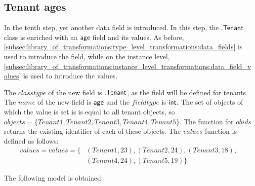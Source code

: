 \subsection{Tenant ages}
\label{sec:application:building_the_model:tenant_ages}

In the tenth step, yet another data field is introduced. In this step, the $.\mathsf{Tenant}$ class is enriched with an $\mathsf{age}$ field and its values. As before, \cref{subsec:library_of_transformations:type_level_transformations:data_fields} is used to introduce the field, while on the instance level, \cref{subsec:library_of_transformations:instance_level_transformations:data_field_values} is used to introduce the values.

The $classtype$ of the new field is $.\mathsf{Tenant}$, as the field will be defined for tenants. The $name$ of the new field is $\mathsf{age}$ and the $fieldtype$ is $\mathsf{int}$. The set of objects of which the value is set is is equal to all tenant objects, so $objects = \{Tenant1, Tenant2, Tenant3, Tenant4, Tenant5\}$. The function for $obids$ returns the existing identifier of each of these objects. The $values$ function is defined as follows:
\begin{align*}
    values = values = \{&(Tenant1, 23), (Tenant2, 24), (Tenant3, 18), \\&(Tenant4, 24), (Tenant5, 19)\}
\end{align*}

The following model is obtained:


